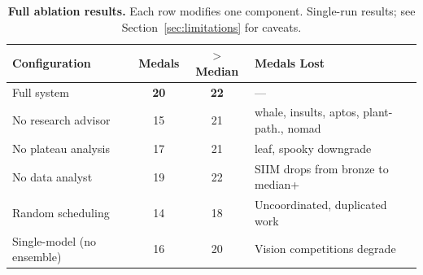 \documentclass{article}
\begin{document}
\begin{table}[t]
\centering
\caption{\textbf{Full ablation results.} Each row modifies one component. Single-run results; see Section~\ref{sec:limitations} for caveats.}
\label{tab:full_ablation}
\small
\begin{tabular}{lccl}
\toprule
\textbf{Configuration} & \textbf{Medals} & \textbf{$>$Median} & \textbf{Medals Lost} \\
\midrule
Full system & \textbf{20} & \textbf{22} & --- \\
No research advisor & 15 & 21 & whale, insults, aptos, plant-path., nomad \\
No plateau analysis & 17 & 21 & leaf, spooky downgrade \\
No data analyst & 19 & 22 & SIIM drops from bronze to median+ \\
Random scheduling & 14 & 18 & Uncoordinated, duplicated work \\
Single-model (no ensemble) & 16 & 20 & Vision competitions degrade \\
\bottomrule
\end{tabular}
\end{table}
\end{document}
